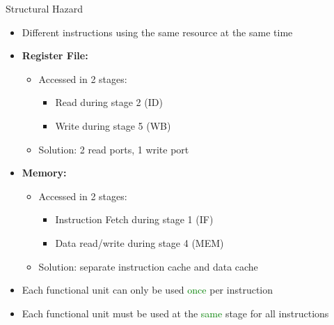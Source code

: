 \documentclass[aspectratio=169,12pt]{beamer}
\begin{document}
\begin{frame}{Structural Hazard}
    \begin{itemize}
        \item Different instructions using the same resource at the same time
        \item \textbf{Register File:}
        \begin{itemize}
            \item Accessed in 2 stages:
            \begin{itemize}
                \item Read during stage 2 (ID)
                \item Write during stage 5 (WB)
            \end{itemize}
            \item Solution: 2 read ports, 1 write port
        \end{itemize}
        \item \textbf{Memory:}
        \begin{itemize}
            \item Accessed in 2 stages:
            \begin{itemize}
                \item Instruction Fetch during stage 1 (IF)
                \item Data read/write during stage 4 (MEM)
            \end{itemize}
            \item Solution: separate instruction cache and data cache
        \end{itemize}
        \item Each functional unit can only be used \textcolor{green}{once} per instruction
        \item Each functional unit must be used at the \textcolor{green}{same} stage for all instructions
    \end{itemize}
\end{frame}
\end{document}
